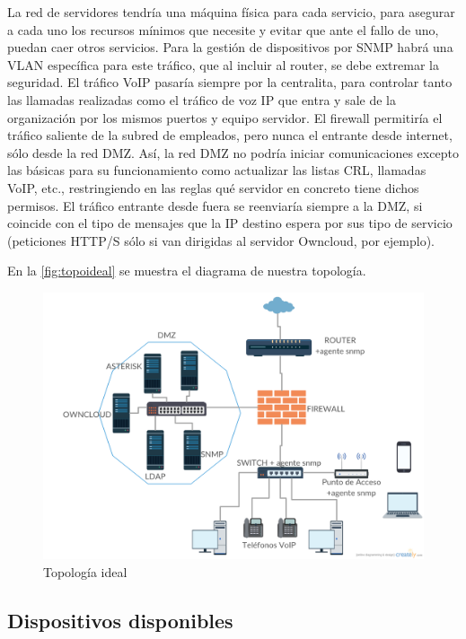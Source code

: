 \documentclass[]{article}
\begin{document}
La red de servidores tendría una máquina física para cada servicio, para asegurar a cada uno los recursos mínimos que necesite y evitar que ante el fallo de uno, puedan caer otros servicios. Para la gestión de dispositivos por SNMP habrá una VLAN específica para este tráfico, que al incluir al router, se debe extremar la seguridad. El tráfico VoIP pasaría siempre por la centralita, para controlar tanto las llamadas realizadas como el tráfico de voz IP que entra y sale de la organización por los mismos puertos y equipo servidor. El firewall permitiría el tráfico saliente de la subred de empleados, pero nunca el entrante desde internet, sólo desde la red DMZ. Así, la red DMZ no podría iniciar comunicaciones excepto las básicas para su funcionamiento como actualizar las listas CRL, llamadas VoIP, etc., restringiendo en las reglas qué servidor en concreto tiene dichos permisos. El tráfico entrante desde fuera se reenviaría siempre a la DMZ, si coincide con el tipo de mensajes que la IP destino espera por sus tipo de servicio (peticiones HTTP/S sólo si van dirigidas al servidor Owncloud, por ejemplo).

En la \autoref{fig:topoideal} se muestra el diagrama de nuestra topología.

\begin{figure}[h]
	\centering
	\includegraphics[scale=0.35]{images/topoideal.png}
	\caption{Topología ideal}
	\label{fig:topoideal}
\end{figure}

\subsection{Dispositivos disponibles}
\end{document}
